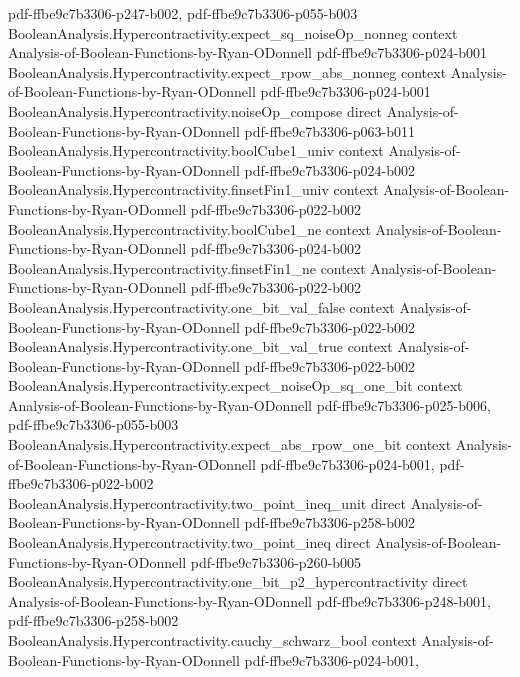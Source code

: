 \begin{theorem}
  {pdf-ffbe9c7b3306-p247-b002,
    pdf-ffbe9c7b3306-p055-b003}
\proofstep
  {BooleanAnalysis.Hypercontractivity.expect_sq_noiseOp_nonneg}
  {context}
  {Analysis-of-Boolean-Functions-by-Ryan-ODonnell}
  {pdf-ffbe9c7b3306-p024-b001}
\proofstep
  {BooleanAnalysis.Hypercontractivity.expect_rpow_abs_nonneg}
  {context}
  {Analysis-of-Boolean-Functions-by-Ryan-ODonnell}
  {pdf-ffbe9c7b3306-p024-b001}
\proofstep
  {BooleanAnalysis.Hypercontractivity.noiseOp_compose}
  {direct}
  {Analysis-of-Boolean-Functions-by-Ryan-ODonnell}
  {pdf-ffbe9c7b3306-p063-b011}
\proofstep
  {BooleanAnalysis.Hypercontractivity.boolCube1_univ}
  {context}
  {Analysis-of-Boolean-Functions-by-Ryan-ODonnell}
  {pdf-ffbe9c7b3306-p024-b002}
\proofstep
  {BooleanAnalysis.Hypercontractivity.finsetFin1_univ}
  {context}
  {Analysis-of-Boolean-Functions-by-Ryan-ODonnell}
  {pdf-ffbe9c7b3306-p022-b002}
\proofstep
  {BooleanAnalysis.Hypercontractivity.boolCube1_ne}
  {context}
  {Analysis-of-Boolean-Functions-by-Ryan-ODonnell}
  {pdf-ffbe9c7b3306-p024-b002}
\proofstep
  {BooleanAnalysis.Hypercontractivity.finsetFin1_ne}
  {context}
  {Analysis-of-Boolean-Functions-by-Ryan-ODonnell}
  {pdf-ffbe9c7b3306-p022-b002}
\proofstep
  {BooleanAnalysis.Hypercontractivity.one_bit_val_false}
  {context}
  {Analysis-of-Boolean-Functions-by-Ryan-ODonnell}
  {pdf-ffbe9c7b3306-p022-b002}
\proofstep
  {BooleanAnalysis.Hypercontractivity.one_bit_val_true}
  {context}
  {Analysis-of-Boolean-Functions-by-Ryan-ODonnell}
  {pdf-ffbe9c7b3306-p022-b002}
\proofstep
  {BooleanAnalysis.Hypercontractivity.expect_noiseOp_sq_one_bit}
  {context}
  {Analysis-of-Boolean-Functions-by-Ryan-ODonnell}
  {pdf-ffbe9c7b3306-p025-b006,
    pdf-ffbe9c7b3306-p055-b003}
\proofstep
  {BooleanAnalysis.Hypercontractivity.expect_abs_rpow_one_bit}
  {context}
  {Analysis-of-Boolean-Functions-by-Ryan-ODonnell}
  {pdf-ffbe9c7b3306-p024-b001,
    pdf-ffbe9c7b3306-p022-b002}
\proofstep
  {BooleanAnalysis.Hypercontractivity.two_point_ineq_unit}
  {direct}
  {Analysis-of-Boolean-Functions-by-Ryan-ODonnell}
  {pdf-ffbe9c7b3306-p258-b002}
\proofstep
  {BooleanAnalysis.Hypercontractivity.two_point_ineq}
  {direct}
  {Analysis-of-Boolean-Functions-by-Ryan-ODonnell}
  {pdf-ffbe9c7b3306-p260-b005}
\proofstep
  {BooleanAnalysis.Hypercontractivity.one_bit_p2_hypercontractivity}
  {direct}
  {Analysis-of-Boolean-Functions-by-Ryan-ODonnell}
  {pdf-ffbe9c7b3306-p248-b001,
    pdf-ffbe9c7b3306-p258-b002}
\proofstep
  {BooleanAnalysis.Hypercontractivity.cauchy_schwarz_bool}
  {context}
  {Analysis-of-Boolean-Functions-by-Ryan-ODonnell}
  {pdf-ffbe9c7b3306-p024-b001,
}
\end{theorem}
